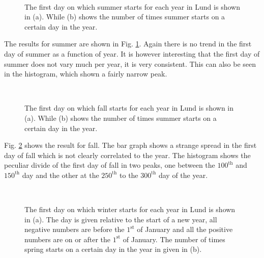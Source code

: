 \begin{figure}[ht!]
\centering
{} 
\\
\caption{The first day on which summer starts for each year in Lund is shown in (a).  While (b) shows the number of times summer starts on a certain day in the year.}
\label{fig:summer}
\end{figure}

The results for summer are shown in Fig. \ref{fig:summer}. Again there is no trend in the first day of summer as a function of year. It is however interesting that the first day of summer does not vary much per year, it is very consistent. This can also be seen in the histogram, which shown a fairly narrow peak.  \\

\begin{figure}[ht!]
\centering
{} 
\\
\caption{The first day on which fall starts for each year in Lund is shown in (a).  While (b) shows the number of times summer starts on a certain day in the year.}
\label{fig:fall}
\end{figure}

Fig. \ref{fig:fall} shows the result for fall. The bar graph shows a strange spread in the first day of fall which is not clearly correlated to the year. The histogram shows the peculiar divide of the first day of fall in two peaks, one between the $100^\text{th}$ and $150^\text{th}$ day and the other at the $250^\text{th}$ to the $300^\text{th}$ day of the year. \\

\begin{figure}[ht!]
\centering
{} 
\\
\caption{The first day on which winter starts for each year in Lund is shown in (a). The day is given relative to the start of a new year, all negative numbers are before the $1^{\text{st}}$ of January and all the positive numbers are on or after the $1^\text{st}$ of January.  The number of times spring starts on a certain day in the year in given in (b).}
\label{fig:winter}
\end{figure}

